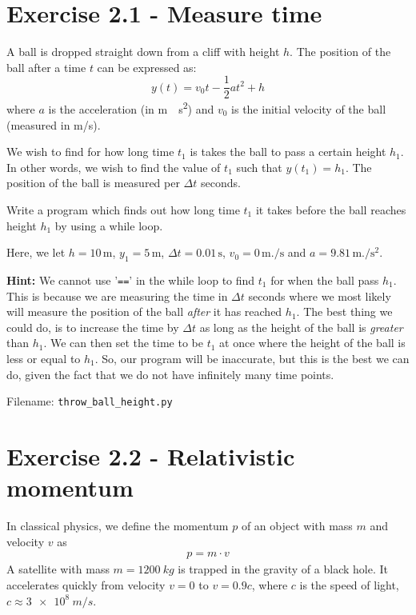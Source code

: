 \documentclass[10pt,a4paper]{article}
\begin{document}
	\section*{Exercise 2.1 - Measure time}
	
	A ball is dropped straight down from a cliff with height $h$. The position of the ball after a time $t$ can be expressed as:
	\[
	y(t) = v_0t - \frac{1}{2}at^2 + h
	\]
	where $a$ is the acceleration (in \si{\meter.\per\square\second}) and $v_0$ is the initial velocity of the ball (measured in m/s).
	
	We wish to find for how long time $t_1$ is takes the ball to pass a certain height $h_1$. In other words, we wish to find the value of $t_1$ such that $y(t_1) = h_1$. The position of the ball is measured per $\Delta t$ seconds. 
	
	Write a program which finds out how long time $t_1$ it takes before the ball reaches height $h_1$ by using a while loop.
	
	Here, we let $h = 10\, \si{\meter}$, $y_1 = 5\,\si{\meter}$, $\Delta t = 0.01\,\si{\second}$, $v_0 = 0\,\si{\meter.\per\second}$ and $a = 9.81\,\si{\meter.\per\square\second}$.
	
	\textbf{Hint: } We cannot use '\texttt{==}' in the while loop to find $t_1$ for when the ball pass $h_1$. This is because we are measuring the time in $\Delta t$ seconds where we most likely will measure the position of the ball \textit{after} it has reached $h_1$. The best thing we could do, is to increase the time by $\Delta t$ as long as the height of the ball is \textit{greater} than $h_1$. We can then set the time to be $t_1$ at once where the height of the ball is less or equal to $h_1$. 
	So, our program will be inaccurate, but this is the best we can do, given the fact that we do not have infinitely many time points. 
	
	Filename: \texttt{throw\_ball\_height.py}


\section*{Exercise 2.2 - Relativistic momentum}
In classical physics, we define the momentum $p$ of an object with mass $m$ and velocity $v$ as
\begin{align*}
p = m\cdot v
\end{align*}
A satellite with mass $m = \SI{1200}{kg}$ is trapped in the gravity of a black hole. It accelerates quickly from velocity $v = 0$ to $v = 0.9c$, where $c$ is the speed of light, $c \approx \SI{3e8}{m/s}$.
\end{document}
